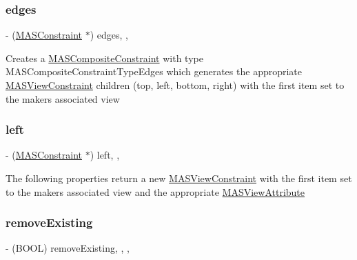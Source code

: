 \subsubsection{\texorpdfstring{edges}{edges}}
{\footnotesize\ttfamily -\/ (\mbox{\hyperlink{interface_m_a_s_constraint}{M\+A\+S\+Constraint}} $\ast$) edges\hspace{0.3cm}{\ttfamily [read]}, {\ttfamily [nonatomic]}, {\ttfamily [strong]}}

Creates a \mbox{\hyperlink{interface_m_a_s_composite_constraint}{M\+A\+S\+Composite\+Constraint}} with type M\+A\+S\+Composite\+Constraint\+Type\+Edges which generates the appropriate \mbox{\hyperlink{interface_m_a_s_view_constraint}{M\+A\+S\+View\+Constraint}} children (top, left, bottom, right) with the first item set to the makers associated view \mbox{\label{interface_m_a_s_constraint_maker_a28585728db886b42bb855814decdcd75}} 
\subsubsection{\texorpdfstring{left}{left}}
{\footnotesize\ttfamily -\/ (\mbox{\hyperlink{interface_m_a_s_constraint}{M\+A\+S\+Constraint}} $\ast$) left\hspace{0.3cm}{\ttfamily [read]}, {\ttfamily [nonatomic]}, {\ttfamily [strong]}}

The following properties return a new \mbox{\hyperlink{interface_m_a_s_view_constraint}{M\+A\+S\+View\+Constraint}} with the first item set to the makers associated view and the appropriate \mbox{\hyperlink{interface_m_a_s_view_attribute}{M\+A\+S\+View\+Attribute}} \mbox{\label{interface_m_a_s_constraint_maker_a04e1b295327d024abdc49fe5ae011dab}} 
\subsubsection{\texorpdfstring{remove\+Existing}{removeExisting}}
{\footnotesize\ttfamily -\/ (B\+O\+OL) remove\+Existing\hspace{0.3cm}{\ttfamily [read]}, {\ttfamily [write]}, {\ttfamily [nonatomic]}, {\ttfamily [assign]}}

